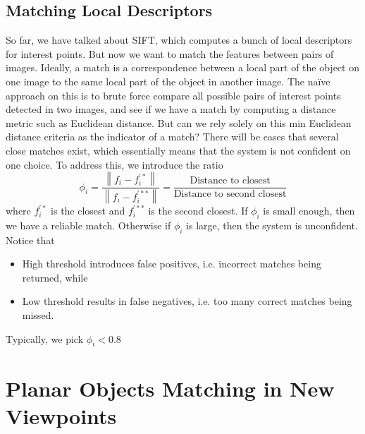 \documentclass[11pt]{article}
\begin{document}
\subsection{Matching Local Descriptors}
So far, we have talked about SIFT, which computes a bunch of local descriptors for interest points. But now we want to match the features between pairs of images. Ideally, a match is a correspondence between a local part of the object on one image to the same local part of the object in another image. The na\"ive approach on this is to brute force compare all possible pairs of interest points detected in two images, and see if we have a match by computing a distance metric such as Euclidean distance. But can we rely solely on this min Euclidean distance criteria as the indicator of a match? There will be cases that several close matches exist, which essentially means that the system is not confident on one choice. To address this, we introduce the ratio
\begin{equation}
	\phi_{i}=\frac{\left\|f_{i}-f_{i}^{\prime *}\right\|}{\left\|f_{i}-f_{i}^{\prime **}\right\|} = \frac{{\text {Distance to closest}}}{{\text {Distance to second closest}}}
\end{equation}
where $f_i^{\prime \ast}$ is the closest and $f_i^{\prime \ast\ast}$ is the second closest. If $\phi_i$ is small enough, then we have a reliable match. Otherwise if $\phi_i$ is large, then the system is unconfident. Notice that
\begin{itemize}
	\item High threshold introduces false positives, i.e. incorrect matches being returned, while
	\item Low threshold results in false negatives, i.e. too many correct matches being missed. 
\end{itemize}
Typically, we pick $\phi_i < 0.8 $

\section{Planar Objects Matching in New Viewpoints}
\end{document}
